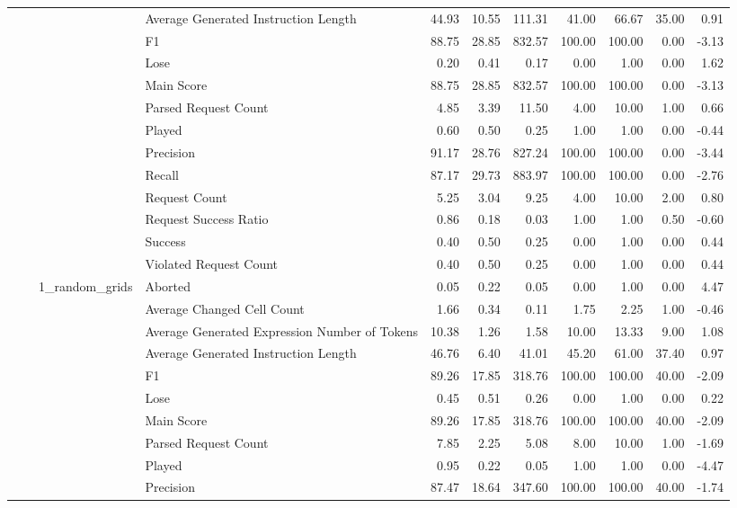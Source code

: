 \begin{tabular}{llllrrrrrrr}
 &  &  & Average Generated Instruction Length & 44.93 & 10.55 & 111.31 & 41.00 & 66.67 & 35.00 & 0.91 \\
 &  &  & F1 & 88.75 & 28.85 & 832.57 & 100.00 & 100.00 & 0.00 & -3.13 \\
 &  &  & Lose & 0.20 & 0.41 & 0.17 & 0.00 & 1.00 & 0.00 & 1.62 \\
 &  &  & Main Score & 88.75 & 28.85 & 832.57 & 100.00 & 100.00 & 0.00 & -3.13 \\
 &  &  & Parsed Request Count & 4.85 & 3.39 & 11.50 & 4.00 & 10.00 & 1.00 & 0.66 \\
 &  &  & Played & 0.60 & 0.50 & 0.25 & 1.00 & 1.00 & 0.00 & -0.44 \\
 &  &  & Precision & 91.17 & 28.76 & 827.24 & 100.00 & 100.00 & 0.00 & -3.44 \\
 &  &  & Recall & 87.17 & 29.73 & 883.97 & 100.00 & 100.00 & 0.00 & -2.76 \\
 &  &  & Request Count & 5.25 & 3.04 & 9.25 & 4.00 & 10.00 & 2.00 & 0.80 \\
 &  &  & Request Success Ratio & 0.86 & 0.18 & 0.03 & 1.00 & 1.00 & 0.50 & -0.60 \\
 &  &  & Success & 0.40 & 0.50 & 0.25 & 0.00 & 1.00 & 0.00 & 0.44 \\
 &  &  & Violated Request Count & 0.40 & 0.50 & 0.25 & 0.00 & 1.00 & 0.00 & 0.44 \\
\cline{3-11}
 &  & \multirow[t]{15}{*}{1_random_grids} & Aborted & 0.05 & 0.22 & 0.05 & 0.00 & 1.00 & 0.00 & 4.47 \\
 &  &  & Average Changed Cell Count & 1.66 & 0.34 & 0.11 & 1.75 & 2.25 & 1.00 & -0.46 \\
 &  &  & Average Generated Expression Number of Tokens & 10.38 & 1.26 & 1.58 & 10.00 & 13.33 & 9.00 & 1.08 \\
 &  &  & Average Generated Instruction Length & 46.76 & 6.40 & 41.01 & 45.20 & 61.00 & 37.40 & 0.97 \\
 &  &  & F1 & 89.26 & 17.85 & 318.76 & 100.00 & 100.00 & 40.00 & -2.09 \\
 &  &  & Lose & 0.45 & 0.51 & 0.26 & 0.00 & 1.00 & 0.00 & 0.22 \\
 &  &  & Main Score & 89.26 & 17.85 & 318.76 & 100.00 & 100.00 & 40.00 & -2.09 \\
 &  &  & Parsed Request Count & 7.85 & 2.25 & 5.08 & 8.00 & 10.00 & 1.00 & -1.69 \\
 &  &  & Played & 0.95 & 0.22 & 0.05 & 1.00 & 1.00 & 0.00 & -4.47 \\
 &  &  & Precision & 87.47 & 18.64 & 347.60 & 100.00 & 100.00 & 40.00 & -1.74 \\

\end{tabular}
